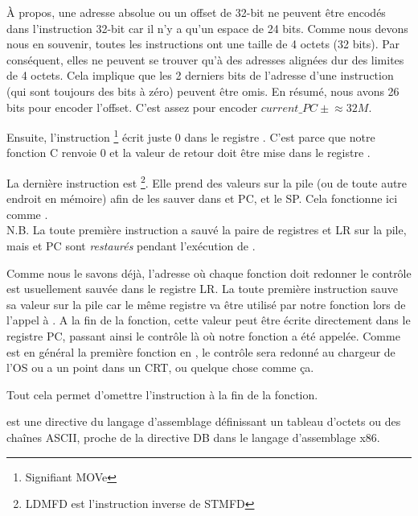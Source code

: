 À propos, une adresse absolue ou un offset de 32-bit ne peuvent être encodés
dans l'instruction 32-bit  car il n'y a qu'un espace de 24 bits.
Comme nous devons nous en souvenir, toutes les instructions ont une taille de
4 octets (32 bits).
Par conséquent, elles ne peuvent se trouver qu'à des adresses alignées dur des
limites de 4 octets.
Cela implique que les 2 derniers bits de l'adresse d'une instruction (qui sont
toujours des bits à zéro) peuvent être omis.
En résumé, nous avons 26 bits pour encoder l'offset. C'est assez pour encoder
$current\_PC \pm{} \approx{}32M$.

Ensuite, l'instruction \footnote{Signifiant MOVe} écrit juste
0 dans le registre .
C'est parce que notre fonction C renvoie 0 et la valeur de retour doit être
mise dans le registre .

La dernière instruction est \footnote{\ac{LDMFD} est
l'instruction inverse de \ac{STMFD}}.
Elle prend des valeurs sur la pile (ou de toute autre endroit en mémoire)
afin de les sauver dans  et \ac{PC}, et 
le  \ac{SP}.
Cela fonctionne ici comme \POP.\\
N.B. La toute première instruction  a sauvé la paire de registres
 et \ac{LR} sur la pile, mais  et \ac{PC} sont \emph{restaurés}
pendant l'exécution de .

Comme nous le savons déjà, l'adresse où chaque fonction doit redonner le
contrôle est usuellement sauvée dans le registre \ac{LR}.
La toute première instruction sauve sa valeur sur la pile car le même
registre va être utilisé par notre fonction \main lors de l'appel à \printf.
A la fin de la fonction, cette valeur peut être écrite directement dans le
registre \ac{PC}, passant ainsi le contrôle là où notre fonction a été appelée.
Comme \main est en général la première fonction en \CCpp, le contrôle sera
redonné au chargeur de l'\ac{OS} ou a un point dans un \ac{CRT}, ou quelque
chose comme ça.

Tout cela permet d'omettre l'instruction  à la fin de la fonction.

 est une directive du langage d'assemblage définissant un tableau d'octets
ou des chaînes ASCII, proche de la directive DB dans le langage d'assemblage x86.

